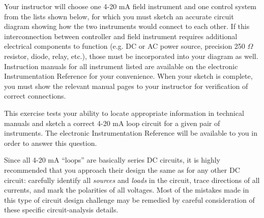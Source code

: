 

Your instructor will choose one 4-20 mA field instrument and one control system from the lists shown below, for which you must sketch an accurate circuit diagram showing how the two instruments would connect to each other.  If this interconnection between controller and field instrument requires additional electrical components to function (e.g. DC or AC power source, precision 250 $\Omega$ resistor, diode, relay, etc.), those must be incorporated into your diagram as well.  Instruction manuals for all instrument listed are available on the electronic Instrumentation Reference for your convenience.  When your sketch is complete, you must show the relevant manual pages to your instructor for verification of correct connections.

This exercise tests your ability to locate appropriate information in technical manuals and sketch a correct 4-20 mA loop circuit for a given pair of instruments.  The electronic Instrumentation Reference will be available to you in order to answer this question.

\vskip 10pt

Since all 4-20 mA ``loops'' are basically series DC circuits, it is highly recommended that you approach their design the same as for any other DC circuit: carefully identify all {\it sources} and {\it loads} in the circuit, trace directions of all currents, and mark the polarities of all voltages.  Most of the mistakes made in this type of circuit design challenge may be remedied by careful consideration of these specific circuit-analysis details.


